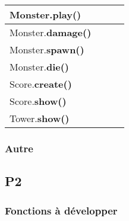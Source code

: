 \documentclass[a4paper]{article}
\begin{document}
\begin{tabular}{|l|c|c|c|}
      \hline
      Monster.\textbf{play()} & & & \\
      \hline
      Monster.\textbf{damage()} & & & \\
      \hline 
      Monster.\textbf{spawn()} & & & \\
      \hline
      Monster.\textbf{die()} & & & \\
      \hline
      \hline
      Score.\textbf{create()} & & & \\
      \hline
      Score.\textbf{show()} & & & \\
      \hline
      \hline
      Tower.\textbf{show()} & & & \\
      \hline
      
        \end{tabular}  
      
            \subsubsection{Autre}
        \subsection{P2}
            \subsubsection{Fonctions à développer}
\end{document}
